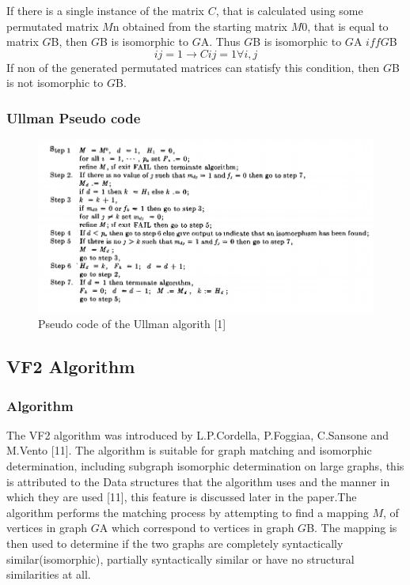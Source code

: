 If there is a single instance of the matrix $C$, that is calculated using some permutated matrix $M${\tiny n} obtained from the starting matrix $M0$, that is equal to matrix $G${\tiny B}, then $G${\tiny B} is isomorphic to $G${\tiny A}. Thus $G${\tiny B} is isomorphic to $G${\tiny A} $iff G${\tiny B}
  \begin{equation}	
	ij = 1 \rightarrow  Cij = 1 \forall i,j
  \end{equation} 
If non of the generated permutated matrices can statisfy this condition, then $G${\tiny B} is not isomorphic to $G${\tiny B}.

\subsubsection{Ullman Pseudo code}
	\begin{figure}[H]
	  \begin{center}
		  \includegraphics[width=1.0\textwidth]{Ullmanpseudo}
	  \end{center}    
	  \caption{Pseudo code of the Ullman algorith [1]}
	  \label{fig:ullmanpseudo}
	\end{figure} 
\newpage

 \subsection{VF2 Algorithm}
\label{VF2 Algorithm}

\subsubsection{Algorithm}

 The VF2 algorithm was introduced by L.P.Cordella, P.Foggiaa, C.Sansone and M.Vento [11]. The algorithm is suitable for graph matching and isomorphic determination, including subgraph isomorphic determination on large graphs, this is attributed to the Data structures that the algorithm uses and the manner in which they are used [11], this feature is discussed later in the paper.\newline\newline The algorithm performs the matching process by attempting to find a mapping $M$, of vertices in graph $G${\tiny A} which correspond to vertices in graph $G${\tiny B}. The mapping is then used to determine if the two graphs are completely syntactically similar(isomorphic), partially syntactically similar or have no structural similarities at all.

